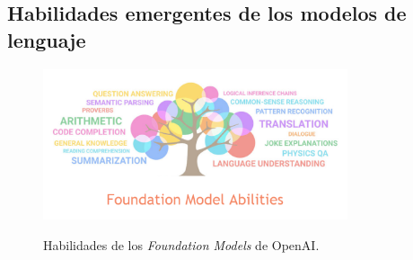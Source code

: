\subsection{Habilidades emergentes de los modelos de lenguaje}

\begin{figure}
    \caption{Habilidades de los \textit{Foundation Models} de OpenAI.}
    \centering
    \includegraphics[width=0.8\textwidth]{./figuras/fundation_models_habilities.png}
    \label{fig:fundation_models_habilities}
\end{figure}
